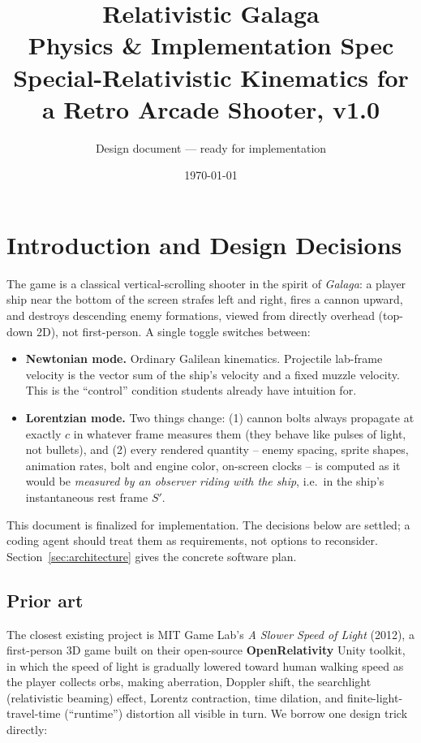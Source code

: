 \documentclass[11pt]{article}
\title{\textbf{Relativistic Galaga}\\[2pt]\large Physics \& Implementation Spec\\[2pt]\normalsize Special-Relativistic Kinematics for a Retro Arcade Shooter, v1.0}
\author{Design document — ready for implementation}
\date{\today}
\begin{document}
\maketitle
\tableofcontents

\section{Introduction and Design Decisions}

The game is a classical vertical-scrolling shooter in the spirit of \emph{Galaga}: a player ship near the bottom of the screen strafes left and right, fires a cannon upward, and destroys descending enemy formations, viewed from directly overhead (top-down 2D), not first-person. A single toggle switches between:

\begin{itemize}[leftmargin=1.5em]
  \item \textbf{Newtonian mode.} Ordinary Galilean kinematics. Projectile lab-frame velocity is the vector sum of the ship's velocity and a fixed muzzle velocity. This is the ``control'' condition students already have intuition for.
  \item \textbf{Lorentzian mode.} Two things change: (1) cannon bolts always propagate at exactly $c$ in whatever frame measures them (they behave like pulses of light, not bullets), and (2) every rendered quantity -- enemy spacing, sprite shapes, animation rates, bolt and engine color, on-screen clocks -- is computed as it would be \emph{measured by an observer riding with the ship}, i.e.\ in the ship's instantaneous rest frame $S'$.
\end{itemize}

This document is finalized for implementation. The decisions below are settled; a coding agent should treat them as requirements, not options to reconsider. Section~\ref{sec:architecture} gives the concrete software plan.

\subsection{Prior art}

The closest existing project is MIT Game Lab's \emph{A Slower Speed of Light} (2012), a first-person 3D game built on their open-source \textbf{OpenRelativity} Unity toolkit, in which the speed of light is gradually lowered toward human walking speed as the player collects orbs, making aberration, Doppler shift, the searchlight (relativistic beaming) effect, Lorentz contraction, time dilation, and finite-light-travel-time (``runtime'') distortion all visible in turn. We borrow one design trick directly:
\end{document}
